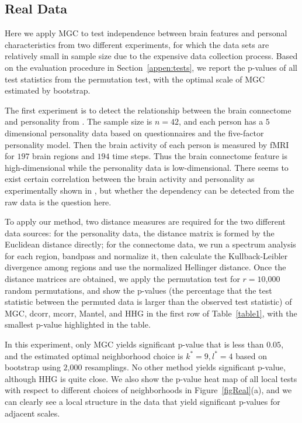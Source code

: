 \documentclass[11pt]{article}
\begin{document}
\subsection{Real Data}
\label{numer3}
Here we apply MGC to test independence between brain features and personal characteristics from two different experiments, for which the data sets are relatively small in sample size due to the expensive data collection process. Based on the evaluation procedure in Section~\ref{appen:tests}, we report the p-values of all test statistics from the permutation test, with the optimal scale of MGC estimated by bootstrap.

The first experiment is to detect the relationship between the brain connectome and personality from \cite{AdelsteinEtAl2011}. The sample size is $n=42$, and each person has a $5$ dimensional personality data based on questionnaires and the five-factor personality model. Then the brain activity of each person is measured by fMRI for $197$ brain regions and $194$ time steps. Thus the brain connectome feature is high-dimensional while the personality data is low-dimensional. There seems to exist certain correlation between the brain activity and personality as experimentally shown in \cite{AdelsteinEtAl2011}, but whether the dependency can be detected from the raw data is the question here.

To apply our method, two distance measures are required for the two different data sources: for the personality data, the distance matrix is formed by the Euclidean distance directly; for the connectome data, we run a spectrum analysis for each region, bandpass and normalize it, then calculate the Kullback-Leibler divergence among regions and use the normalized Hellinger distance. Once the distance matrices are obtained, we apply the permutation test for $r=10$,$000$ random permutations, and show the p-values (the percentage that the test statistic between the permuted data is larger than the observed test statistic) of MGC, dcorr, mcorr, Mantel, and HHG in the first row of Table~\ref{table1}, with the smallest p-value highlighted in the table. 

In this experiment, only MGC yields significant p-value that is less than $0.05$, and the estimated optimal neighborhood choice is $k^{*}=9, l^{*}=4$ based on bootstrap using $2$,$000$ resamplings. No other method yields significant p-value, although HHG is quite close. We also show the p-value heat map of all local tests with respect to different choices of neighborhoods in Figure~\ref{figReal}(a), and we can clearly see a local structure in the data that yield significant p-values for adjacent scales.
\end{document}
